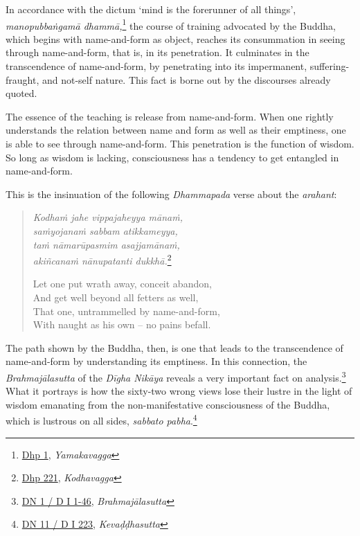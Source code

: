 In accordance with the dictum `mind is the forerunner of all things', \emph{manopubbaṅgamā dhammā,}\footnote{\href{https://suttacentral.net/dhp1-20/pli/ms}{Dhp 1}, \emph{Yamakavagga}} the course of training advocated by the Buddha, which begins with name-and-form as object, reaches its consummation in seeing through name-and-form, that is, in its penetration. It culminates in the transcendence of name-and-form, by penetrating into its impermanent, suffering-fraught, and not-self nature. This fact is borne out by the discourses already quoted.

The essence of the teaching is release from name-and-form. When one rightly understands the relation between name and form as well as their emptiness, one is able to see through name-and-form. This penetration is the function of wisdom. So long as wisdom is lacking, consciousness has a tendency to get entangled in name-and-form.

This is the insinuation of the following \emph{Dhammapada} verse about the \emph{arahant}:

\begin{quote}
\emph{Kodhaṁ jahe vippajaheyya mānaṁ,}\\
\emph{saṁyojanaṁ sabbam atikkameyya,}\\
\emph{taṁ nāmarūpasmim asajjamānaṁ,}\\
\emph{akiñcanaṁ nānupatanti dukkhā.}\footnote{\href{https://suttacentral.net/dhp221-234/pli/ms}{Dhp 221}, \emph{Kodhavagga}}

Let one put wrath away, conceit abandon,\\
And get well beyond all fetters as well,\\
That one, untrammelled by name-and-form,\\
With naught as his own -- no pains befall.
\end{quote}

The path shown by the Buddha, then, is one that leads to the transcendence of name-and-form by understanding its emptiness. In this connection, the \emph{Brahmajālasutta} of the \emph{Dīgha Nikāya} reveals a very important fact on analysis.\footnote{\href{https://suttacentral.net/dn1/pli/ms}{DN 1 / D I 1-46}, \emph{Brahmajālasutta}} What it portrays is how the sixty-two wrong views lose their lustre in the light of wisdom emanating from the non-manifestative consciousness of the Buddha, which is lustrous on all sides, \emph{sabbato pabha}.\footnote{\href{https://suttacentral.net/dn11/pli/ms}{DN 11 / D I 223}, \emph{Kevaḍḍhasutta}}

